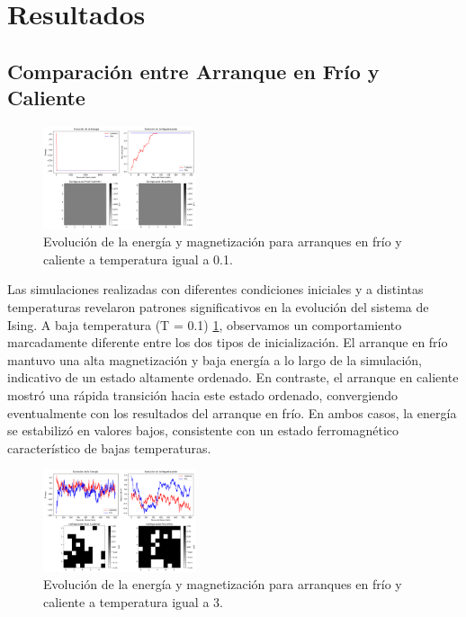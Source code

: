 \documentclass[twocolumn]{article}
\begin{document}
\section{Resultados}

\subsection*{Comparación entre Arranque en Frío y Caliente}

\begin{figure}[hbt]
    \centering
    \includegraphics[width=0.4\textwidth]{figures/frioCaliente01.png}
    \caption{Evolución de la energía y magnetización para arranques en frío y caliente a temperatura igual a 0.1.}
    \label{fig:frioCaliente01}
\end{figure}

Las simulaciones realizadas con diferentes condiciones iniciales y a distintas temperaturas revelaron patrones significativos en la evolución del sistema de Ising. A baja temperatura (T = 0.1) \ref{fig:frioCaliente01}, observamos un comportamiento marcadamente diferente entre los dos tipos de inicialización. El arranque en frío mantuvo una alta magnetización y baja energía a lo largo de la simulación, indicativo de un estado altamente ordenado. En contraste, el arranque en caliente mostró una rápida transición hacia este estado ordenado, convergiendo eventualmente con los resultados del arranque en frío. En ambos casos, la energía se estabilizó en valores bajos, consistente con un estado ferromagnético característico de bajas temperaturas.

\begin{figure}[hbt]
    \centering
    \includegraphics[width=0.4\textwidth]{figures/frioCaliente3.png}
    \caption{Evolución de la energía y magnetización para arranques en frío y caliente a temperatura igual a 3.}
    \label{fig:frioCaliente3}
\end{figure}
\end{document}
